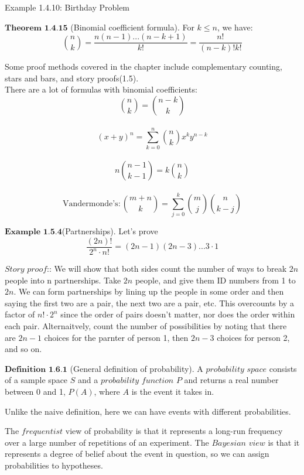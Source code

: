 \documentclass{article}
\begin{document}
    Example 1.4.10: Birthday Problem

    $\textbf{Theorem 1.4.15}$ (Binomial coefficient formula). For $k\le n$, we have:
    $$ {n\choose k} = \frac{n(n-1)...(n-k+1)}{k!} = \frac{n!}{(n-k)!k!}$$

    Some proof methods covered in the chapter include complementary counting, stars and bars, and story proofs(1.5).\\

    There are a lot of formulas with binomial coefficients:\\
        $${n\choose k} = {n-k\choose k}$$\\
        $$(x+y)^n = \sum_{k=0}^n {n\choose k}x^ky^{n-k}$$\\
        $$n{n-1 \choose k-1} = k{n\choose k}$$\\
        $$\textrm{Vandermonde's}: {m+n\choose k}= \sum_{j=0}^k{m\choose j}{n\choose k-j}$$

    $\textbf{Example 1.5.4}$(Partnerships). Let's prove\\

    $$\frac{(2n)!}{2^n\cdot n!}=(2n-1)(2n-3)...3\cdot1$$

    $\textit{Story proof:}$: We will show that both sides count the number of ways to break $2n$
        people into n partnerships. Take $2n$ people, and give them ID numbers from 1 to $2n$. We can form
        partnerships by lining up the people in some order and then saying the first two
        are a pair, the next two are a pair, etc. This overcounts by a factor of $n!\cdot 2^n$ since 
        the order of pairs doesn't matter, nor does the order within each pair. Alternaitvely, count the 
        number of possibilities by noting that there are $2n-1$ choices for the parnter of person 1, then
        $2n-3$ choices for person 2, and so on.

    $\textbf{Definition 1.6.1}$ (General definition of probability). A $\textit{probability space}$ consists of a sample 
        space $S$ and a $\textit{probability function } P$ and returns a real number between 0 and 1, $P(A)$, where 
        $A$ is the event it takes in.

    Unlike the naive definition, here we can have events with different probabilities.
    
    The $\textit{frequentist}$ view of probability is that it represents a long-run frequency over
        a large number of repetitions of an experiment. The $\textit{Bayesian view}$ is that it represents a
        degree of belief about the event in question, so we can assign probabilities to hypotheses.
\end{document}
